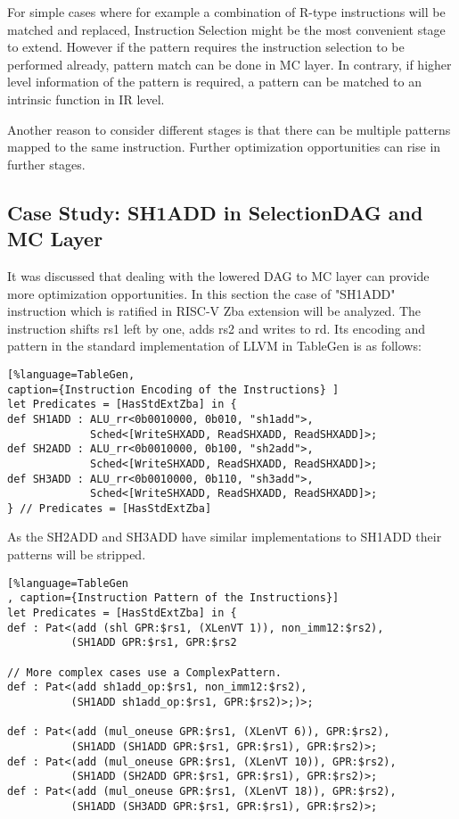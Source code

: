 For simple cases where for example a combination of R-type instructions will be matched and replaced, Instruction Selection might be the most convenient stage to extend. However if the pattern requires the instruction selection to be performed already, pattern match can be done in MC layer. In contrary, if higher level information of the pattern is required, a pattern can be matched to an intrinsic function in IR level. 

Another reason to consider different stages is that there can be multiple patterns mapped to the same instruction. Further optimization opportunities can rise in further stages. 

\subsection{Case Study: SH1ADD in SelectionDAG and MC Layer}

It was discussed that dealing with the lowered DAG to MC layer can provide more optimization opportunities. In this section the case of "SH1ADD" instruction which is ratified in RISC-V Zba extension will be analyzed. The instruction shifts rs1 left by one, adds rs2 and writes to rd. Its encoding and pattern in the standard implementation of LLVM in TableGen is as follows:

\begin{lstlisting}[%language=TableGen,
caption={Instruction Encoding of the Instructions} ]
let Predicates = [HasStdExtZba] in {
def SH1ADD : ALU_rr<0b0010000, 0b010, "sh1add">,
             Sched<[WriteSHXADD, ReadSHXADD, ReadSHXADD]>;
def SH2ADD : ALU_rr<0b0010000, 0b100, "sh2add">,
             Sched<[WriteSHXADD, ReadSHXADD, ReadSHXADD]>;
def SH3ADD : ALU_rr<0b0010000, 0b110, "sh3add">,
             Sched<[WriteSHXADD, ReadSHXADD, ReadSHXADD]>;
} // Predicates = [HasStdExtZba]
\end{lstlisting}

As the SH2ADD and SH3ADD have similar implementations to SH1ADD their patterns will be stripped.

\begin{lstlisting}[%language=TableGen
, caption={Instruction Pattern of the Instructions}]
let Predicates = [HasStdExtZba] in {
def : Pat<(add (shl GPR:$rs1, (XLenVT 1)), non_imm12:$rs2),
          (SH1ADD GPR:$rs1, GPR:$rs2

// More complex cases use a ComplexPattern.
def : Pat<(add sh1add_op:$rs1, non_imm12:$rs2),
          (SH1ADD sh1add_op:$rs1, GPR:$rs2)>;)>;

def : Pat<(add (mul_oneuse GPR:$rs1, (XLenVT 6)), GPR:$rs2),
          (SH1ADD (SH1ADD GPR:$rs1, GPR:$rs1), GPR:$rs2)>;
def : Pat<(add (mul_oneuse GPR:$rs1, (XLenVT 10)), GPR:$rs2),
          (SH1ADD (SH2ADD GPR:$rs1, GPR:$rs1), GPR:$rs2)>;
def : Pat<(add (mul_oneuse GPR:$rs1, (XLenVT 18)), GPR:$rs2),
          (SH1ADD (SH3ADD GPR:$rs1, GPR:$rs1), GPR:$rs2)>;
\end{lstlisting}

